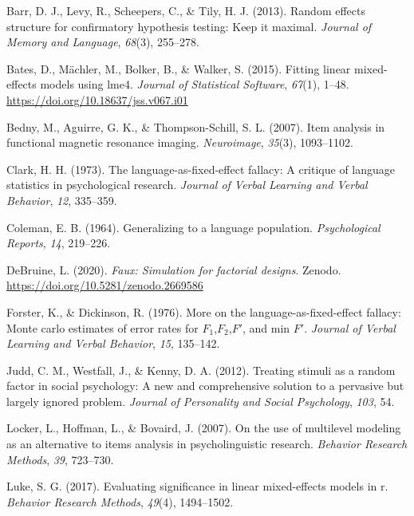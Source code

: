 \documentclass[english,doc,floatsintext]{apa6}
\begin{document}
\leavevmode\hypertarget{ref-barr_et_al_2013}{}%
Barr, D. J., Levy, R., Scheepers, C., \& Tily, H. J. (2013). Random effects structure for confirmatory hypothesis testing: Keep it maximal. \emph{Journal of Memory and Language}, \emph{68}(3), 255--278.

\leavevmode\hypertarget{ref-R-lme4}{}%
Bates, D., Mächler, M., Bolker, B., \& Walker, S. (2015). Fitting linear mixed-effects models using lme4. \emph{Journal of Statistical Software}, \emph{67}(1), 1--48. \url{https://doi.org/10.18637/jss.v067.i01}

\leavevmode\hypertarget{ref-bedny_aguirre_thompson-schill_2007}{}%
Bedny, M., Aguirre, G. K., \& Thompson-Schill, S. L. (2007). Item analysis in functional magnetic resonance imaging. \emph{Neuroimage}, \emph{35}(3), 1093--1102.

\leavevmode\hypertarget{ref-clark_1973}{}%
Clark, H. H. (1973). The language-as-fixed-effect fallacy: A critique of language statistics in psychological research. \emph{Journal of Verbal Learning and Verbal Behavior}, \emph{12}, 335--359.

\leavevmode\hypertarget{ref-coleman_1964}{}%
Coleman, E. B. (1964). Generalizing to a language population. \emph{Psychological Reports}, \emph{14}, 219--226.

\leavevmode\hypertarget{ref-R-faux}{}%
DeBruine, L. (2020). \emph{Faux: Simulation for factorial designs}. Zenodo. \url{https://doi.org/10.5281/zenodo.2669586}

\leavevmode\hypertarget{ref-forster_dickinson_1976}{}%
Forster, K., \& Dickinson, R. (1976). More on the language-as-fixed-effect fallacy: Monte carlo estimates of error rates for \(F_1\),\(F_2\),\(F'\), and min \(F'\). \emph{Journal of Verbal Learning and Verbal Behavior}, \emph{15}, 135--142.

\leavevmode\hypertarget{ref-judd_westfall_kenny_2012}{}%
Judd, C. M., Westfall, J., \& Kenny, D. A. (2012). Treating stimuli as a random factor in social psychology: A new and comprehensive solution to a pervasive but largely ignored problem. \emph{Journal of Personality and Social Psychology}, \emph{103}, 54.

\leavevmode\hypertarget{ref-locker_hoffman_bovaird_2007}{}%
Locker, L., Hoffman, L., \& Bovaird, J. (2007). On the use of multilevel modeling as an alternative to items analysis in psycholinguistic research. \emph{Behavior Research Methods}, \emph{39}, 723--730.

\leavevmode\hypertarget{ref-luke-2017}{}%
Luke, S. G. (2017). Evaluating significance in linear mixed-effects models in r. \emph{Behavior Research Methods}, \emph{49}(4), 1494--1502.
\end{document}
